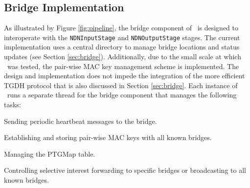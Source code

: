 \subsection{Bridge Implementation}
As illustrated by Figure \ref{fig:pipeline}, the bridge component of \sink\ is designed to interoperate with the {\tt NDNInputStage} and {\tt NDNOutputStage} stages. The current implementation uses a central directory to manage bridge locations and status updates (see Section \ref{sec:bridge}). Additionally, due to the small scale at which \sink\ was tested, the pair-wise MAC key management scheme is implemented. The design and implementation does not impede the integration of the more efficient TGDH protocol that is also discussed in Section \ref{sec:bridge}. Each instance of \sink\ runs a separate thread for the bridge component that manages the following tasks:
\begin{compactitem}
	\item Sending periodic heartbeat messages to the bridge.
	\item Establishing and storing pair-wise MAC keys with all known bridges.
	\item Managing the {\sf PTGMap} table.
	\item Controlling selective interest forwarding to specific bridges or broadcasting to all known bridges.
\end{compactitem}

